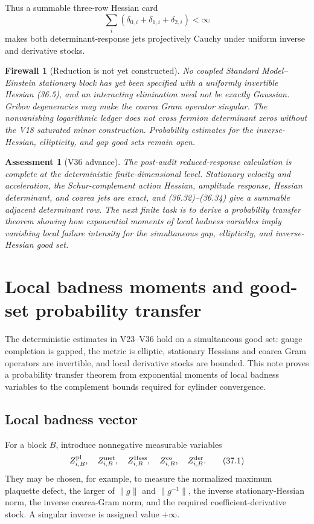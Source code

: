 \documentclass[11pt]{article}
\newtheorem{assessment}[theorem]{Assessment}
\newtheorem{firewall}[theorem]{Firewall}
\begin{document}
Thus a summable three-row Hessian card
\[
 \sum_i(\delta_{0,i}+\delta_{1,i}+\delta_{2,i})<\infty
 \tag{36.34}
\]
makes both determinant-response jets projectively Cauchy under uniform
inverse and derivative stocks.

\begin{firewall}[Reduction is not yet constructed]
\label{fw:v11v36-reduction}
No coupled Standard Model--Einstein stationary block has yet been
specified with a uniformly invertible Hessian (36.5), and an interacting
elimination need not be exactly Gaussian.  Gribov degeneracies may make
the coarea Gram operator singular.  The nonvanishing logarithmic ledger
does not cross fermion determinant zeros without the V18 saturated
minor construction.  Probability estimates for the inverse-Hessian,
ellipticity, and gap good sets remain open.
\end{firewall}

\begin{assessment}[V36 advance]
\label{ass:v11v36}
The post-audit reduced-response calculation is complete at the
deterministic finite-dimensional level.  Stationary velocity and
acceleration, the Schur-complement action Hessian, amplitude response,
Hessian determinant, and coarea jets are exact, and (36.32)--(36.34)
give a summable adjacent determinant row.  The next finite task is to
derive a probability transfer theorem showing how exponential moments
of local badness variables imply vanishing local failure intensity for
the simultaneous gap, ellipticity, and inverse-Hessian good set.
\end{assessment}
\section{Local badness moments and good-set probability transfer}
\label{sec:v11v37}

The deterministic estimates in V23--V36 hold on a simultaneous good
set: gauge completion is gapped, the metric is elliptic, stationary
Hessians and coarea Gram operators are invertible, and local derivative
stocks are bounded.  This note proves a probability transfer theorem
from exponential moments of local badness variables to the complement
bounds required for cylinder convergence.

\subsection{Local badness vector}

For a block \(B\), introduce nonnegative measurable variables
\[
 Z^{\rm pl}_{i,B},\quad
 Z^{\rm met}_{i,B},\quad
 Z^{\rm Hess}_{i,B},\quad
 Z^{\rm co}_{i,B},\quad
 Z^{\rm der}_{i,B}.
 \tag{37.1}
\]
They may be chosen, for example, to measure the normalized maximum
plaquette defect, the larger of
\(\|g\|\) and \(\|g^{-1}\|\), the inverse stationary-Hessian norm, the
inverse coarea-Gram norm, and the required coefficient-derivative
stock.  A singular inverse is assigned value \(+\infty\).
\end{document}
